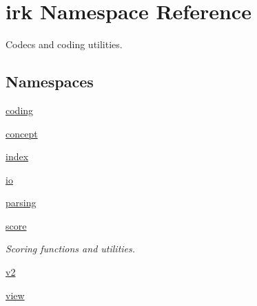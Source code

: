 \hypertarget{namespaceirk}{}\section{irk Namespace Reference}
\label{namespaceirk}


Codecs and coding utilities.  


\subsection*{Namespaces}
\begin{DoxyCompactItemize}
\item 
 \mbox{\hyperlink{namespaceirk_1_1coding}{coding}}
\item 
 \mbox{\hyperlink{namespaceirk_1_1concept}{concept}}
\item 
 \mbox{\hyperlink{namespaceirk_1_1index}{index}}
\item 
 \mbox{\hyperlink{namespaceirk_1_1io}{io}}
\item 
 \mbox{\hyperlink{namespaceirk_1_1parsing}{parsing}}
\item 
 \mbox{\hyperlink{namespaceirk_1_1score}{score}}
\begin{DoxyCompactList}\small\item\em Scoring functions and utilities. \end{DoxyCompactList}\item 
 \mbox{\hyperlink{namespaceirk_1_1v2}{v2}}
\item 
 \mbox{\hyperlink{namespaceirk_1_1view}{view}}
\end{DoxyCompactItemize}
